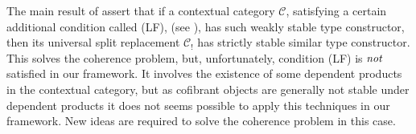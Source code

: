 \documentclass[reqno,10pt,a4paper,oneside,draft]{amsart}
\begin{document}
\begin{remark}
The main result of \cite{LumsdaineP:locuoc} assert that if a contextual category $\mathcal{C}$, satisfying a certain additional condition called (LF), (see \cite[definition 3.1.3]{LumsdaineP:locuoc}), has such weakly stable type constructor, then its universal split replacement $\mathcal{C}_!$ has strictly stable similar type constructor. This solves the coherence problem, but, unfortunately, condition (LF) is $\emph{not}$ satisfied in our framework. It involves the existence of some dependent products in the contextual category, but as cofibrant objects are generally not stable under dependent products it does not seems possible to apply this techniques in our framework.  New ideas are required to solve the coherence problem in this case.
\end{remark}







\end{document}
